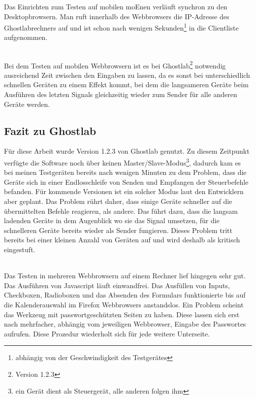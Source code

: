 		Das Einrichten zum Testen auf mobilen \Gls{moEn}en verläuft synchron zu den Desktopbrowsern. Man ruft innerhalb des \Gls{Webbrowser}s die IP-Adresse des Ghostlabrechners auf und ist schon nach wenigen Sekunden\footnote{abhängig von der Geschwindigkeit des Testgerätes} in die Clientliste aufgenommen.
		
		\\Bei dem Testen auf mobilen \Gls{Webbrowser}n ist es bei Ghostlab\footnote{Version 1.2.3} notwendig ausreichend Zeit zwischen den Eingaben zu lassen, da es sonst bei unterschiedlich schnellen Geräten zu einem Effekt kommt, bei dem die langsameren Geräte beim Ausführen des letzten Signals gleichzeitig wieder zum Sender für alle anderen Geräte werden.
		
		\pagebreak
		
		\subsection{Fazit zu Ghostlab}
		Für diese Arbeit wurde Version 1.2.3 von Ghostlab genutzt. Zu diesem Zeitpunkt verfügte die Software noch über keinen Master/Slave-Modus\footnote{ein Gerät dient als Steuergerät, alle anderen folgen ihm}, dadurch kam es bei meinen Testgeräten bereits nach wenigen Minuten zu dem Problem, dass die Geräte sich in einer Endlosschleife von Senden und Empfangen der Steuerbefehle befanden. Für kommende Versionen ist ein solcher Modus laut den Entwicklern aber geplant. Das Problem rührt daher, dass einige Geräte schneller auf die übermittelten Befehle reagieren, als andere. Das führt dazu, dass die langsam ladenden Geräte in dem Augenblick wo sie das Signal umsetzen, für die schnelleren Geräte bereits wieder als Sender fungieren. Dieses Problem tritt bereits bei einer kleinen Anzahl von Geräten auf und wird deshalb als kritisch eingestuft. 

		\\Das Testen in mehreren \Gls{Webbrowser}n auf einem Rechner lief hingegen sehr gut. Das Ausführen von \Gls{Javascript} läuft einwandfrei. Das Ausfüllen von \Gls{Input}s, \Gls{Checkbox}en, \Gls{Radiobox}en und das Absenden des Formulars funktionierte bis auf die Kalenderauswahl im Firefox \Gls{Webbrowser}s anstandslos. Ein Problem scheint das Werkzeug mit passwortgeschützten Seiten zu haben. Diese lassen sich erst nach mehrfacher, abhängig vom jeweiligen \Gls{Webbrowser}, Eingabe des Passwortes aufrufen. Diese Prozedur wiederholt sich für jede weitere Unterseite. 

